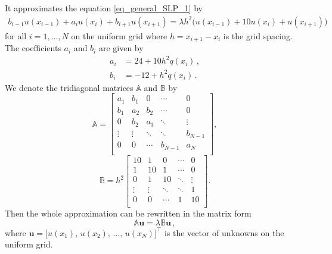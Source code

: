 \documentclass[11pt,a4paper,oneside,openright]{report} %
\begin{document}
It approximates the equation \eqref{eq_general_SLP_1} by
\begin{equation}
    \begin{split}
    b_{i-1} u(x_{i-1}) + a_{i} u(x_i ) + b_{i+1} u(x_{i+1}) = \lambda h^2 \big(u(x_{i-1}) + 10 u(x_i) + u(x_{i+1}) \big) \, 
    \end{split}
\end{equation}
for all $i = 1, \dots,N$ on the uniform grid where $h = x_{i+1}-x_i$ is the grid spacing. The coefficients $a_i$ and $b_i$ are given by
\begin{subequations}\label{}
    \begin{align}
        a_i & = 24 + 10 h^2 q(x_i) \, , \label{} \\[2pt]
        b_i & = -12 + h^2 q(x_i) \, .   \label{}
    \end{align}
\end{subequations}
We denote the tridiagonal matrices $\mathbb{A}$ and $\mathbb{B}$ by
\begin{equation}
\mathbb{A} = \begin{bmatrix}
    a_1 & b_1 & 0  & \cdots & 0 \\
    b_1 & a_2 & b_2  & \cdots & 0 \\
    0 & b_2 & a_3  &  \ddots & \vdots \\
    \vdots & \vdots  &  \ddots & \ddots & b_{N-1} \\
    0 & 0 & \cdots & b_{N-1} & a_N  \\
\end{bmatrix} ,
\label{}
\end{equation}
\begin{equation}
\mathbb{B} = h^2\begin{bmatrix}
    10 & 1 & 0 & \cdots & 0 \\
    1 & 10 & 1 & \cdots & 0 \\
    0 & 1 & 10 & \ddots & \vdots \\
    \vdots & \vdots  & \ddots & \ddots & 1 \\
    0 & 0 & \cdots & 1 & 10  \\
\end{bmatrix} .
\label{}
\end{equation}
Then the whole approximation can be rewritten in the matrix form
\begin{equation}
    \mathbb{A} \boldsymbol{u} = \lambda \mathbb{B} \boldsymbol{u} \, ,
\end{equation}
where $\boldsymbol{u} = \big[u(x_1), \, u(x_2), \, \dots, \, u(x_N)\big]^\top$ is the vector of unknowns on the uniform grid.
\end{document}
